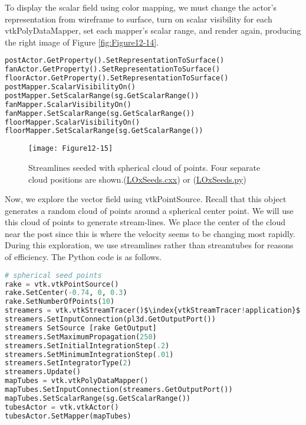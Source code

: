 \noindent To display the scalar field using color mapping, we must change the actor's representation from wireframe to surface, turn on scalar visibility for each vtkPolyDataMapper, set each mapper's scalar range, and render again, producing the right image of Figure \ref{fig:Figure12-14}.

\begin{lstlisting}[language=Python, caption={Display the scalar field.}]
postActor.GetProperty().SetRepresentationToSurface()
fanActor.GetProperty().SetRepresentationToSurface()
floorActor.GetProperty().SetRepresentationToSurface()
postMapper.ScalarVisibilityOn()
postMapper.SetScalarRange(sg.GetScalarRange())
fanMapper.ScalarVisibilityOn()
fanMapper.SetScalarRange(sg.GetScalarRange())
floorMapper.ScalarVisibilityOn()
floorMapper.SetScalarRange(sg.GetScalarRange())
\end{lstlisting}

\begin{figure}[!htb]
    \centering
    \texttt{[image: Figure12-15]}
    \caption{Streamlines seeded with spherical cloud of points. Four separate cloud positions are shown.(\href{https://lorensen.github.io/VTKExamples/site/Cxx/VisualizationAlgorithms/LOxSeeds/}{LOxSeeds.cxx}) or (\href{https://lorensen.github.io/VTKExamples/site/Python/VisualizationAlgorithms/LOxSeeds/}{LOxSeeds.py})}
    \label{fig:Figure12-15}
\end{figure}


\noindent Now, we explore the vector field using vtkPointSource. Recall that this object generates a random cloud of points around a spherical center point. We will use this cloud of points to generate stream-lines. We place the center of the cloud near the post since this is where the velocity seems to be changing most rapidly. During this exploration, we use streamlines rather than streamtubes for reasons of efficiency. The Python code is as follows.

\begin{lstlisting}[language=Python, caption={Explore the vector field using a point source.}, escapechar=\$]
# spherical seed points
rake = vtk.vtkPointSource()
rake.SetCenter(-0.74, 0, 0.3)
rake.SetNumberOfPoints(10)
streamers = vtk.vtkStreamTracer()$\index{vtkStreamTracer!application}$
streamers.SetInputConnection(pl3d.GetOutputPort())
streamers SetSource [rake GetOutput]
streamers.SetMaximumPropagation(250)
streamers.SetInitialIntegrationStep(.2)
streamers.SetMinimumIntegrationStep(.01)
streamers.SetIntegratorType(2)
streamers.Update()
mapTubes = vtk.vtkPolyDataMapper()
mapTubes.SetInputConnection(streamers.GetOutputPort())
mapTubes.SetScalarRange(sg.GetScalarRange())
tubesActor = vtk.vtkActor()
tubesActor.SetMapper(mapTubes)
\end{lstlisting}

